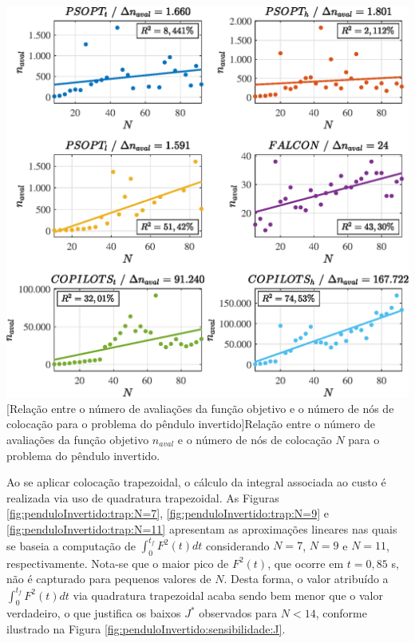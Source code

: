 \noindent
\begin{minipage}{\textwidth}
	\vspace{\onelineskip}
	\centering
	\includegraphics[scale=0.7]{fig/resultados/penduloInvertido/sens/eval}
	[Relação entre o número de avaliações da função objetivo e o número de nós de colocação para o problema do pêndulo invertido]{Relação entre o número de avaliações da função objetivo $ n_{aval} $ e o número de nós de colocação $ N $ para o problema do pêndulo invertido.}
	\label{fig:penduloInvertido:sensibilidade:naval}
	\vspace{\onelineskip}
\end{minipage}


Ao se aplicar colocação trapezoidal, o cálculo da integral associada ao custo é realizada via uso de quadratura trapezoidal. As Figuras \ref{fig:penduloInvertido:trap:N=7}, \ref{fig:penduloInvertido:trap:N=9} e \ref{fig:penduloInvertido:trap:N=11} apresentam as aproximações lineares nas quais se baseia a computação de $ \int_{0}^{t_f} F^2(t) dt $ considerando $ N = 7 $, $ N = 9 $ e $ N = 11 $, respectivamente. Nota-se que o maior pico de $ F^2(t) $, que ocorre em $ t = 0,85 $ s, não é capturado para pequenos valores de $ N $. Desta forma, o valor atribuído a $ \int_{0}^{t_f} F^2(t) dt $ via quadratura trapezoidal acaba sendo bem menor que o valor verdadeiro, o que justifica os baixos $ J^* $ observados para $ N < 14 $, conforme ilustrado na Figura \ref{fig:penduloInvertido:sensibilidade:J}. 

